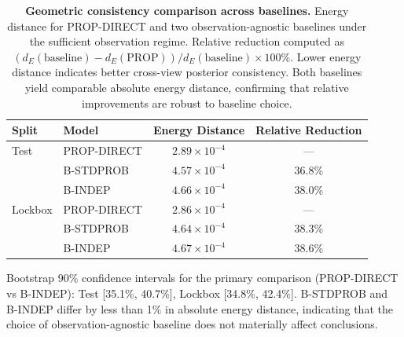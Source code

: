 
\begin{table}[t]
\centering
\begin{threeparttable}
\caption{\textbf{Geometric consistency comparison across baselines.}
Energy distance for PROP-DIRECT and two observation-agnostic baselines
under the sufficient observation regime. Relative reduction computed as
$(d_E(\text{baseline}) - d_E(\text{PROP})) / d_E(\text{baseline}) \times 100\%$.
Lower energy distance indicates better cross-view posterior consistency.
Both baselines yield comparable absolute energy distance, confirming
that relative improvements are robust to baseline choice.}
\label{tab:baseline_comparison}
\begin{tabular}{llcc}
\toprule
\textbf{Split} & \textbf{Model} & \textbf{Energy Distance} & \textbf{Relative Reduction} \\
\midrule
Test   & PROP-DIRECT  & $2.89 \times 10^{-4}$ & --- \\
       & B-STDPROB    & $4.57 \times 10^{-4}$ & 36.8\% \\
       & B-INDEP      & $4.66 \times 10^{-4}$ & 38.0\% \\
\midrule
Lockbox & PROP-DIRECT  & $2.86 \times 10^{-4}$ & --- \\
        & B-STDPROB    & $4.64 \times 10^{-4}$ & 38.3\% \\
        & B-INDEP      & $4.67 \times 10^{-4}$ & 38.6\% \\
\bottomrule
\end{tabular}
\begin{tablenotes}
\footnotesize
\item Bootstrap 90\% confidence intervals for the primary comparison
(PROP-DIRECT vs B-INDEP): Test [35.1\%, 40.7\%], Lockbox [34.8\%, 42.4\%].
B-STDPROB and B-INDEP differ by less than 1\% in absolute energy distance,
indicating that the choice of observation-agnostic baseline does not
materially affect conclusions.
\end{tablenotes}
\end{threeparttable}
\end{table}
